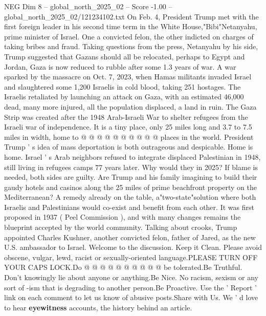 \begin{textsample}{NEG Dim 8 – global\_north\_2025\_02 – Score -1.00 – global\_north\_2025\_02/121234102.txt}  \label{ex:f8_neg_146}
On Feb. 4, President Trump met with the first foreign leader in his second time term in the White House,"Bibi"Netanyahu, prime minister of Israel.
One a convicted felon, the other indicted on charges of taking bribes and fraud.
Taking questions from the press, Netanyahu by his side, Trump suggested that Gazans should all be relocated, perhaps to Egypt and Jordan, Gaza is now reduced to rubble after some 1.3 years of war.
A war sparked by the massacre on Oct. 7, 2023, when Hamas militants invaded Israel and slaughtered some 1,200 Israelis in cold blood, taking 251 hostages.
The Israelis retaliated by launching an attack on Gaza, with an estimated 46,000 dead, many more injured, all the population displaced, a land in ruin.
The Gaza Strip was created after the 1948 Arab-Israeli War to shelter refugees from the Israeli war of independence.
It is a tiny place, only 25 miles long and 3.7 to 7.5 miles in width, home to @ @ @ @ @ @ @ @ @ @ places in the world.
President Trump ' s idea of mass deportation is both outrageous and despicable.
Home is home.
Israel ' s Arab neighbors refused to integrate displaced Palestinian in 1948, still living in refugees camps 77 years later.
Why would they in 2025?
If blame is needed, both sides are guilty.
Are Trump and his family imagining to build their gaudy hotels and casinos along the 25 miles of prime beachfront property on the Mediterranean?
A remedy already on the table, a"two-state"solution where both Israelis and Palestinians would co-exist and benefit from each other.
It was first proposed in 1937 ( Peel Commission ), and with many changes remains the blueprint accepted by the world community.
Talking about crooks, Trump appointed Charles Kushner, another convicted felon, father of Jared, as the new U.S. ambassador to Israel.
Welcome to the discussion.
Keep it Clean.
Please avoid obscene, vulgar, lewd, racist or sexually-oriented language.PLEASE TURN OFF YOUR CAPS LOCK.Do @ @ @ @ @ @ @ @ @ @ be tolerated.Be Truthful.
Don't knowingly lie about anyone or anything.Be Nice.
No racism, sexism or any sort of -ism that is degrading to another person.Be Proactive.
Use the ' Report ' link on each comment to let us know of abusive posts.Share with Us.
We ' d love to hear \textbf{eyewitness} accounts, the history behind an article.

\end{textsample}
